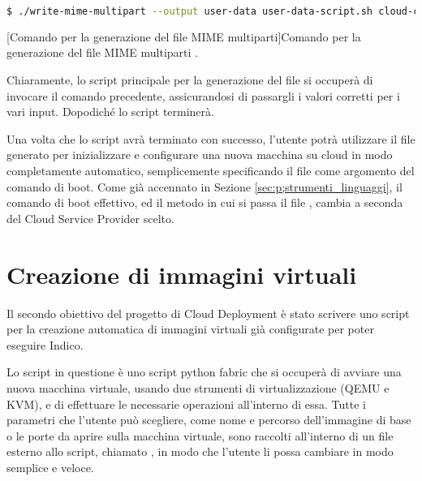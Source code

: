             \begin{center}
                \begin{minipage}{\linewidth}
                    \begin{lstlisting}[language=bash, gobble=22]
                        $ ./write-mime-multipart --output user-data user-data-script.sh cloud-config
                    \end{lstlisting}
                    \captionsetup{textformat=empty,labelformat=empty} \vspace{-2em}
                    [Comando per la generazione del file MIME multiparti]{Comando per la generazione del file \ac{MIME} multiparti .}
                \end{minipage}
            \end{center}
            
            Chiaramente, lo script principale per la generazione del file  si occuperà di invocare il comando precedente, assicurandosi di passargli i valori corretti per i vari input. Dopodiché lo script terminerà.
            
            Una volta che lo script avrà terminato con successo, l'utente potrà utilizzare il file  generato per inizializzare e configurare una nuova macchina su cloud in modo completamente automatico, semplicemente specificando il file  come argomento del comando di boot. Come già accennato in Sezione \ref{sec:p;strumenti_linguaggi}, il comando di boot effettivo, ed il metodo in cui si passa il file , cambia a seconda del Cloud Service Provider scelto.

    \section{Creazione di immagini virtuali} \label{sec:cd;creazione_immagini_virtuali}
    
        Il secondo obiettivo del progetto di Cloud Deployment è stato scrivere uno script per la creazione automatica di immagini virtuali già configurate per poter eseguire Indico.
        
        Lo script in questione è uno script python fabric che si occuperà di avviare una nuova macchina virtuale, usando due strumenti di virtualizzazione (\ac{QEMU} e \ac{KVM}), e di effettuare le necessarie operazioni all'interno di essa. Tutte i parametri che l'utente può scegliere, come nome e percorso dell'immagine di base o le porte da aprire sulla macchina virtuale, sono raccolti all'interno di un file esterno allo script, chiamato , in modo che l'utente li possa cambiare in modo semplice e veloce.
        
